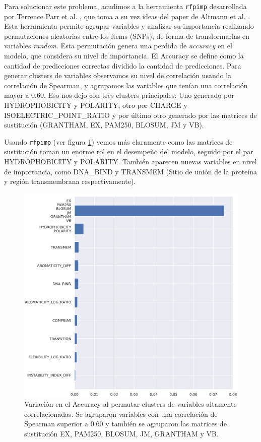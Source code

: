 Para solucionar este problema, acudimos a la herramienta \texttt{rfpimp} desarrollada por Terrence Parr et al. \cite{rfpimp}, que toma a su vez ideas del paper de Altmann et al. \cite{Altmann2010}. Esta herramienta permite agrupar variables y analizar su importancia realizando permutaciones aleatorias entre los ítems (SNPs), de forma de transformarlas en variables \textit{random}. Esta permutación genera una perdida de \textit{accuracy} en el modelo, que considera su nivel de importancia. El Accuracy se define como la cantidad de predicciones correctas dividido la cantidad de predicciones. Para generar clusters de variables observamos su nivel de correlación usando la correlación de Spearman, y agrupamos las variables que tenían una correlación mayor a 0.60. Eso nos dejo con tres clusters principales: Uno generado por HYDROPHOBICITY y POLARITY, otro por CHARGE y ISOELECTRIC\_POINT\_RATIO y por último otro generado por las matrices de sustitución (GRANTHAM, EX, PAM250, BLOSUM, JM y VB). 

Usando \texttt{rfpimp} (ver figura \ref{fig:importances_structural_cluster}) vemos más claramente como las matrices de sustitución toman un enorme rol en el desempeño del modelo, seguido por el par HYDROPHOBICITY y POLARITY. También aparecen nuevas variables en nivel de importancia, como DNA\_BIND y TRANSMEM (Sitio de unión de la proteína y región transmembrana respectivamente).


\newpage

\begin{figure}[H]
    \centering
    \includegraphics[scale=0.7]{documents/latex/figures/3/structural/structural_importance_cluster.pdf}
    \caption{Variación en el Accuracy al permutar clusters de variables altamente correlacionadas. Se agruparon variables con una correlación de Spearman superior a 0.60 y también se agruparon las matrices de sustitución EX, PAM250, BLOSUM, JM, GRANTHAM y VB.}
    \label{fig:importances_structural_cluster}
\end{figure}




